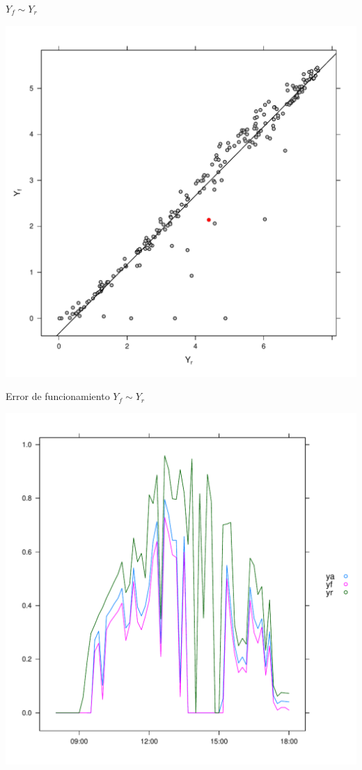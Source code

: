 \documentclass[aspectratio=169, usenames,svgnames,dvipsnames]{beamer}
\begin{document}
\begin{frame}[label={sec:orgf4ad1cf}]{\(Y_f \sim Y_r\)}
\begin{center}
\includegraphics[height=0.95\textheight]{../figs/YfYr.pdf}
\end{center}
\end{frame}

\begin{frame}[label={sec:orgb4a2799}]{Error de funcionamiento \(Y_f \sim Y_r\)}
\begin{center}
\includegraphics[height=0.95\textheight]{../figs/ErrorYf.pdf}
\end{center}
\end{frame}
\end{document}
